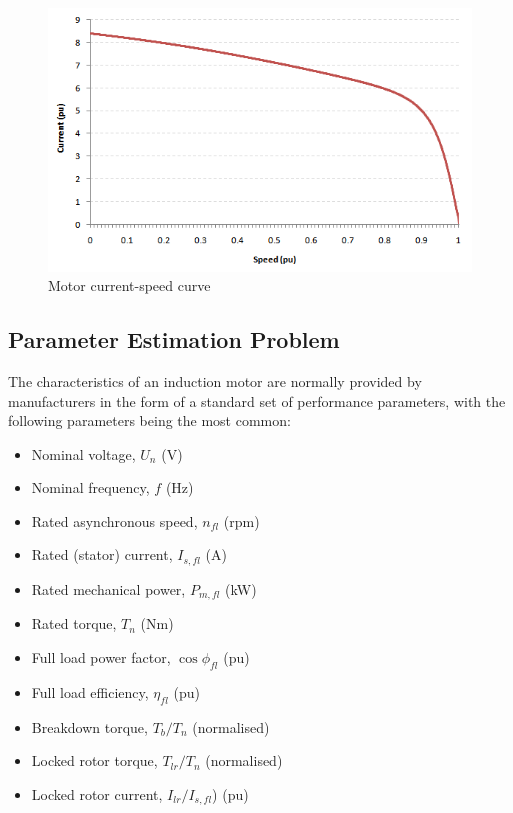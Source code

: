 \documentclass{article}
\begin{document}
\begin{figure}[!htp]
\begin{center}
\includegraphics[scale=0.6]{Figures/current-speed_curve.png}
\caption{Motor current-speed curve}
\label{fig:current-speed_curve}
\end{center}
\end{figure}

\newpage
\subsection{Parameter Estimation Problem}

The characteristics of an induction motor are normally provided by manufacturers in the form of a standard set of performance parameters, with the following parameters being the most common:

\begin{itemize}
\item Nominal voltage, $U_n$ (V)
\item Nominal frequency, $f$ (Hz)
\item Rated asynchronous speed, $n_{fl}$ (rpm)
\item Rated (stator) current, $I_{s,fl}$ (A)
\item Rated mechanical power, $P_{m,fl}$ (kW)
\item Rated torque, $T_{n}$ (Nm)
\item Full load power factor, $\cos{\phi_{fl}}$ (pu)
\item Full load efficiency, $\eta_{fl}$ (pu)
\item Breakdown torque, $T_{b} / T_{n}$ (normalised)
\item Locked rotor torque, $T_{lr} / T_{n}$ (normalised)
\item Locked rotor current, $I_{lr} / I_{s,fl}$) (pu)
\end{itemize}
\end{document}
